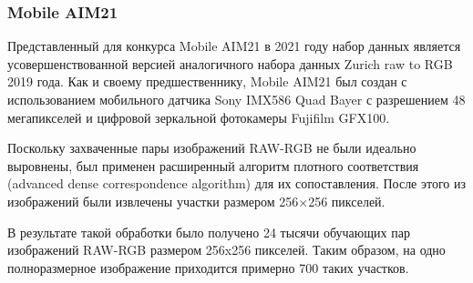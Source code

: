 \subsubsection{Mobile AIM21}

Представленный для конкурса Mobile AIM21 в 2021 году набор данных является усовершенствованной версией аналогичного набора данных Zurich raw to RGB 2019 года. Как и своему предшественнику, Mobile AIM21 был создан с использованием мобильного датчика Sony IMX586 Quad Bayer с разрешением 48 мегапикселей и цифровой зеркальной фотокамеры Fujifilm GFX100.

Поскольку захваченные пары изображений RAW-RGB не были идеально выровнены, был применен расширенный алгоритм плотного соответствия (advanced dense correspondence algorithm) \cite{lib-aim-dense} для их сопоставления. После этого из изображений были извлечены участки размером 256×256 пикселей.

В результате такой обработки было получено 24 тысячи обучающих пар изображений RAW-RGB размером 256x256 пикселей. Таким образом, на одно полноразмерное изображение приходится примерно 700 таких участков.